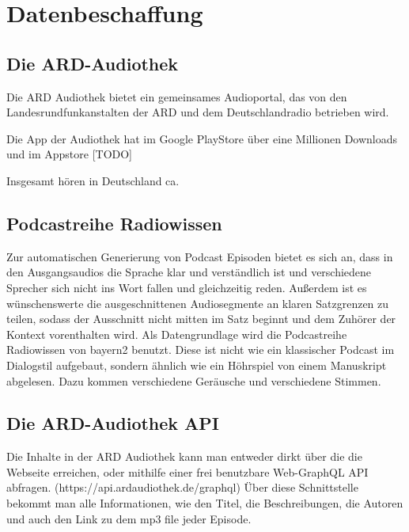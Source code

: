 \chapter{Datenbeschaffung}\label{ch:data}

\section{Die ARD-Audiothek}

Die ARD Audiothek bietet ein gemeinsames Audioportal, das von den Landesrundfunkanstalten der ARD und dem Deutschlandradio betrieben wird.

Die App der Audiothek hat im Google PlayStore über eine Millionen Downloads und im Appstore [TODO]

Insgesamt hören in Deutschland ca. 

\section{Podcastreihe Radiowissen}

Zur automatischen Generierung von Podcast Episoden bietet es sich an, dass in den Ausgangsaudios die Sprache klar und verständlich ist und verschiedene Sprecher sich nicht ins Wort fallen und gleichzeitig reden.
Außerdem ist es wünschenswerte die ausgeschnittenen Audiosegmente an klaren Satzgrenzen zu teilen, sodass der Ausschnitt nicht mitten im Satz beginnt und dem Zuhörer der Kontext vorenthalten wird. 
Als Datengrundlage wird die Podcastreihe Radiowissen von bayern2 benutzt. 
Diese ist nicht wie ein klassischer Podcast im Dialogstil aufgebaut, sondern ähnlich wie ein Höhrspiel von einem Manuskript abgelesen.
Dazu kommen verschiedene Geräusche und verschiedene Stimmen.



\section{Die ARD-Audiothek API}

Die Inhalte in der ARD Audiothek kann man entweder dirkt über die die Webseite erreichen, oder mithilfe einer frei benutzbare Web-GraphQL API abfragen.
(https://api.ardaudiothek.de/graphql) 
Über diese Schnittstelle bekommt man alle Informationen, wie den Titel, die Beschreibungen, die Autoren und auch den Link zu dem mp3 file jeder Episode.

